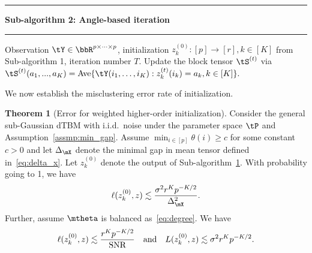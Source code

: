 \documentclass[lettersize,onecolumn,journal]{IEEEtran}
\theoremstyle{definition}
\newtheorem{thm}{Theorem}
\theoremstyle{definition}
\newcommand\Algphase[1]{%
\vspace*{-.7\baselineskip}\Statex\hspace*{\dimexpr-\algorithmicindent-2pt\relax}\rule{\columnwidth}{0.4pt}%
\Statex\hspace*{-\algorithmicindent}\textbf{#1}%
\vspace*{-.7\baselineskip}\Statex\hspace*{\dimexpr-\algorithmicindent-2pt\relax}\rule{\columnwidth}{0.4pt}%
}
\begin{document}
\begin{algorithm}[h!]
\begin{algorithmic}[1]
\Algphase{Sub-algorithm 2: Angle-based iteration}\label{alg:2}
\INPUT Observation $\tY \in \bbR^{p \times \cdots \times p}$, initialization $z^{(0)}_k \colon [p]\to[r], k \in [K]$ from Sub-algorithm 1, iteration number $T$.
\State Update the block tensor $\tS^{(t)}$ via
$\tS^{(t)} (a_1,...,a_K)= \text{Ave} \{\tY(i_1,\ldots,i_K): z^{(t)}_k(i_k) = a_k, k \in [K]\}.$


\EndFor
\EndFor


\end{algorithmic}
\end{algorithm}

We now establish the misclustering error rate of initialization.
{
  
\begin{thm}[Error for weighted higher-order initialization]\label{thm:initial} Consider the general sub-Gaussian dTBM with i.i.d.\ noise under the parameter space $\tP$ and Assumption~\ref{assmp:min_gap}. Assume $\min_{i\in[p]}\theta(i) \geq c$ for some constant $c>0$ and let $\Delta_{\mX}$ denote the minimal gap in mean tensor defined in~\eqref{eq:delta_x}.  Let $ z^{(0)}_k$ denote the output of Sub-algorithm~\hyperref[alg:main]{1}. With probability going to 1, we have
\begin{equation}
    \ell(z^{(0)}_k, z) \lesssim {\sigma^2 r^K p^{-K/2}\over \Delta_{\mX}^2}.
\end{equation}
Further, assume $\mtheta$ is balanced as~\eqref{eq:degree}. We have
\begin{equation}\label{eq:ini}
 \ell(z_k^{(0)}, z) \lesssim {r^K p^{-K/2}\over \text{SNR}} \quad \text{and} \quad L(z^{(0)}_k, z) \lesssim  {\sigma^2 r^K p^{-K/2}}.
\end{equation}
\end{thm}
}
\end{document}
